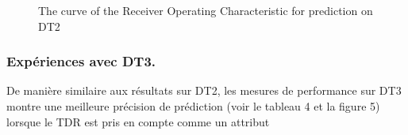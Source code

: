 \begin{figure}[!h]
\centering
{}%
\caption{The curve of the Receiver Operating Characteristic for prediction on DT2}\label{curve_roc_dt2}
\end{figure}
\subsubsection{Expériences avec DT3.}
De manière similaire aux résultats sur DT2, les mesures de performance sur DT3 montre une meilleure précision de prédiction (voir le tableau 4 et la figure 5) lorsque le TDR est pris en compte comme un attribut
\begin{table}[!h]
\centering
{}%
\hspace*{0.5cm}
%
\label{perf-measure-dt3}\caption{Performance measures of the prediction on DT3}
\end{table}


